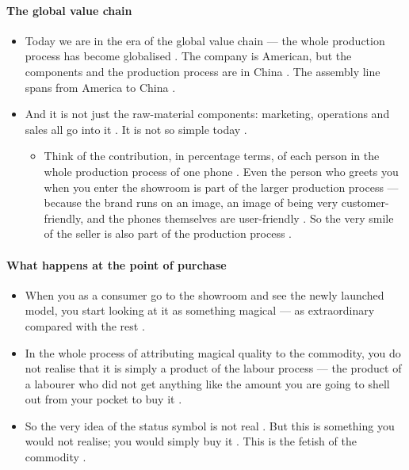 \paragraph{The global value chain}
\begin{itemize}
    \item Today we are in the era of the global value chain --- the whole production process has become globalised . The company is American, but the components and the production process are in China . The assembly line spans from America to China .
    \item And it is not just the raw-material components: marketing, operations and sales all go into it . It is not so simple today .
    \begin{itemize}
        \item Think of the contribution, in percentage terms, of each person in the whole production process of one phone . Even the person who greets you when you enter the showroom is part of the larger production process --- because the brand runs on an image, an image of being very customer-friendly, and the phones themselves are user-friendly . So the very smile of the seller is also part of the production process .
    \end{itemize}
\end{itemize}

\paragraph{What happens at the point of purchase}
\begin{itemize}
    \item When you as a consumer go to the showroom and see the newly launched model, you start looking at it as something magical --- as extraordinary compared with the rest .
    \item In the whole process of attributing magical quality to the commodity, you do not realise that it is simply a product of the labour process --- the product of a labourer who did not get anything like the amount you are going to shell out from your pocket to buy it .
    \item So the very idea of the status symbol is not real . But this is something you would not realise; you would simply buy it . This is the fetish of the commodity .
\end{itemize}

